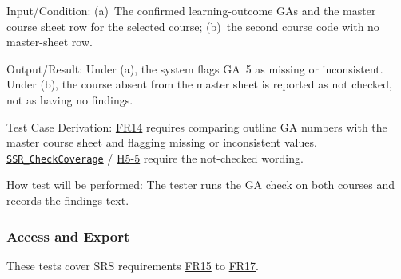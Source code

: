 \documentclass[12pt, titlepage]{article}
\newcommand{\halink}[1]{\href{https://github.com/shivyam/cas-course-optimization/blob/main/pdfs/HazardAnalysis/HazardAnalysis.pdf}{#1}}
\newcommand{\frlink}[1]{\href{https://github.com/shivyam/cas-course-optimization/blob/main/pdfs/SRS-IEEE/SRS.pdf}{FR#1}}
\begin{document}
\begin{enumerate}
Input/Condition: (a)~The confirmed learning-outcome GAs and the master course sheet row for the selected course; (b)~the second course code with no master-sheet row.

Output/Result: Under (a), the system flags GA~5 as missing or inconsistent. Under (b), the course absent from the master sheet is reported as not checked, not as having no findings.

Test Case Derivation: \frlink{14} requires comparing outline GA numbers with the master course sheet and flagging missing or inconsistent values. \halink{\texttt{SSR\_CheckCoverage}} / \halink{H5-5} require the not-checked wording.

How test will be performed: The tester runs the GA check on both courses and records the findings text.

\end{enumerate}

\subsubsection{Access and Export}

These tests cover SRS requirements \frlink{15} to \frlink{17}.
\end{document}
